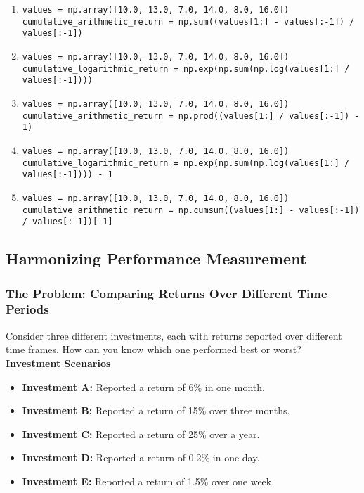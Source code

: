\documentclass{article}
\begin{document}
\begin{enumerate}
    \begin{enumerate}
        \item \texttt{values = np.array([10.0, 13.0, 7.0, 14.0, 8.0, 16.0]) \\
        cumulative\_arithmetic\_return = np.sum((values[1:] - values[:-1]) / values[:-1])}
        \item \texttt{values = np.array([10.0, 13.0, 7.0, 14.0, 8.0, 16.0]) \\
        cumulative\_logarithmic\_return = np.exp(np.sum(np.log(values[1:] / values[:-1])))}
        \item \texttt{values = np.array([10.0, 13.0, 7.0, 14.0, 8.0, 16.0]) \\
        cumulative\_arithmetic\_return = np.prod((values[1:] / values[:-1]) - 1)}
        \item \texttt{values = np.array([10.0, 13.0, 7.0, 14.0, 8.0, 16.0]) \\
        cumulative\_logarithmic\_return = np.exp(np.sum(np.log(values[1:] / values[:-1]))) - 1}
        \item \texttt{values = np.array([10.0, 13.0, 7.0, 14.0, 8.0, 16.0]) \\
        cumulative\_arithmetic\_return = np.cumsum((values[1:] - values[:-1]) / values[:-1])[-1]}
    \end{enumerate}

\end{enumerate}



\clearpage

\subsection{Harmonizing Performance Measurement}

\subsubsection{The Problem: Comparing Returns Over Different Time Periods}

Consider three different investments, each with returns reported over different time frames. How can you know which one performed best or worst? \\

\textbf{Investment Scenarios}

\begin{itemize}
    \item \textbf{Investment A:} Reported a return of 6\% in one month.
    \item \textbf{Investment B:} Reported a return of 15\% over three months.
    \item \textbf{Investment C:} Reported a return of 25\% over a year.
    \item \textbf{Investment D:} Reported a return of 0.2\% in one day.
    \item \textbf{Investment E:} Reported a return of 1.5\% over one week.
\end{itemize}
\end{document}
